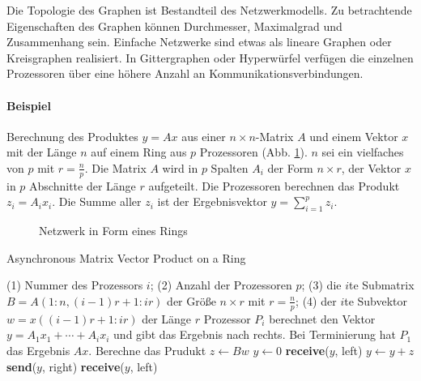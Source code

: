 Die Topologie des Graphen ist Bestandteil des Netzwerkmodells.
Zu betrachtende Eigenschaften des Graphen können Durchmesser, Maximalgrad und Zusammenhang sein.
Einfache Netzwerke sind etwas als lineare Graphen oder Kreisgraphen realisiert.
In Gittergraphen oder Hyperwürfel verfügen die einzelnen Prozessoren über eine höhere Anzahl an Kommunikationsverbindungen.
\cite[S.16f.]{jaja}

\paragraph{Beispiel}
Berechnung des Produktes $y = Ax$ aus einer $n \times n$-Matrix $A$ und einem
Vektor $x$ mit der Länge $n$ auf einem Ring aus $p$ Prozessoren (Abb. \ref{ring}).
$n$ sei ein vielfaches von $p$ mit $r = \frac{n}{p}$.
Die Matrix $A$ wird in $p$ Spalten $A_i$ der Form $n \times r$,
der Vektor $x$ in $p$ Abschnitte der Länge $r$ aufgeteilt.
Die Prozessoren berechnen das Produkt $z_i = A_ix_i$.
Die Summe aller $z_i$ ist der Ergebnisvektor $y = \sum_{i=1}^p z_i$.

\begin{figure}
    \centering
    
    \caption{Netzwerk in Form eines Rings}
    \label{ring}
\end{figure}

\begin{algorithm}
    \caption{Asynchronous Matrix Vector Product on a Ring \cite[S.18]{jaja}}
    \begin{algorithmic}[1]
    \Require (1) Nummer des Prozessors $i$; (2) Anzahl der Prozessoren $p$;
    (3) die $i$te Submatrix $B = A(1:n, (i-1)r+1:ir)$ der Größe $n \times r$ mit $r = \frac{n}{p}$;
    (4) der $i$te Subvektor $w = x((i-1)r+1:ir)$ der Länge $r$
    \Ensure Prozessor $P_i$ berechnet den Vektor $y = A_1x_1 + \cdots + A_ix_i$
    und gibt das Ergebnis nach rechts. Bei Terminierung hat $P_1$ das Ergebnis $Ax$.
    \State Berechne das Prudukt $z \gets Bw$
        \State $y \gets 0$
    \Else
        \State \textbf{receive}($y$, left)
    \EndIf
    \State $y \gets y + z$
    \State \textbf{send}($y$, right)
        \State \textbf{receive}($y$, left)
    \EndIf
    \end{algorithmic}
\end{algorithm}


